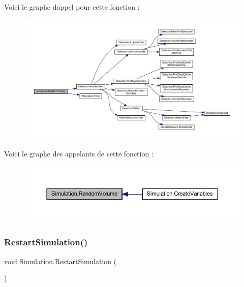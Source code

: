 Voici le graphe d\textquotesingle{}appel pour cette fonction \+:
\nopagebreak
\begin{figure}[H]
\begin{center}
\leavevmode
\includegraphics[width=350pt]{class_simulation_aff8ad1d9fe429a08bf0d42f52b08b71b_cgraph}
\end{center}
\end{figure}
Voici le graphe des appelants de cette fonction \+:\nopagebreak
\begin{figure}[H]
\begin{center}
\leavevmode
\includegraphics[width=350pt]{class_simulation_aff8ad1d9fe429a08bf0d42f52b08b71b_icgraph}
\end{center}
\end{figure}
\mbox{\label{class_simulation_a500982098740ae238f349a6fed0affd8}} 
\subsubsection{\texorpdfstring{Restart\+Simulation()}{RestartSimulation()}}
{\footnotesize\ttfamily void Simulation.\+Restart\+Simulation (\begin{DoxyParamCaption}{ }\end{DoxyParamCaption})\hspace{0.3cm}{\ttfamily [inline]}}



